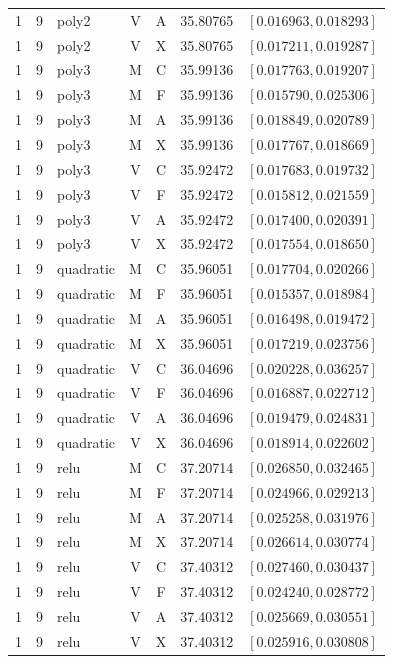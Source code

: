 \begin{longtable}{r r l c c r l}
1 & 9 & poly2 & V & A & 35.80765 & $[0.016963,0.018293]$ \\
1 & 9 & poly2 & V & X & 35.80765 & $[0.017211,0.019287]$ \\
1 & 9 & poly3 & M & C & 35.99136 & $[0.017763,0.019207]$ \\
1 & 9 & poly3 & M & F & 35.99136 & $[0.015790,0.025306]$ \\
1 & 9 & poly3 & M & A & 35.99136 & $[0.018849,0.020789]$ \\
1 & 9 & poly3 & M & X & 35.99136 & $[0.017767,0.018669]$ \\
1 & 9 & poly3 & V & C & 35.92472 & $[0.017683,0.019732]$ \\
1 & 9 & poly3 & V & F & 35.92472 & $[0.015812,0.021559]$ \\
1 & 9 & poly3 & V & A & 35.92472 & $[0.017400,0.020391]$ \\
1 & 9 & poly3 & V & X & 35.92472 & $[0.017554,0.018650]$ \\
1 & 9 & quadratic & M & C & 35.96051 & $[0.017704,0.020266]$ \\
1 & 9 & quadratic & M & F & 35.96051 & $[0.015357,0.018984]$ \\
1 & 9 & quadratic & M & A & 35.96051 & $[0.016498,0.019472]$ \\
1 & 9 & quadratic & M & X & 35.96051 & $[0.017219,0.023756]$ \\
1 & 9 & quadratic & V & C & 36.04696 & $[0.020228,0.036257]$ \\
1 & 9 & quadratic & V & F & 36.04696 & $[0.016887,0.022712]$ \\
1 & 9 & quadratic & V & A & 36.04696 & $[0.019479,0.024831]$ \\
1 & 9 & quadratic & V & X & 36.04696 & $[0.018914,0.022602]$ \\
1 & 9 & relu & M & C & 37.20714 & $[0.026850,0.032465]$ \\
1 & 9 & relu & M & F & 37.20714 & $[0.024966,0.029213]$ \\
1 & 9 & relu & M & A & 37.20714 & $[0.025258,0.031976]$ \\
1 & 9 & relu & M & X & 37.20714 & $[0.026614,0.030774]$ \\
1 & 9 & relu & V & C & 37.40312 & $[0.027460,0.030437]$ \\
1 & 9 & relu & V & F & 37.40312 & $[0.024240,0.028772]$ \\
1 & 9 & relu & V & A & 37.40312 & $[0.025669,0.030551]$ \\
1 & 9 & relu & V & X & 37.40312 & $[0.025916,0.030808]$ \\

\end{longtable}
